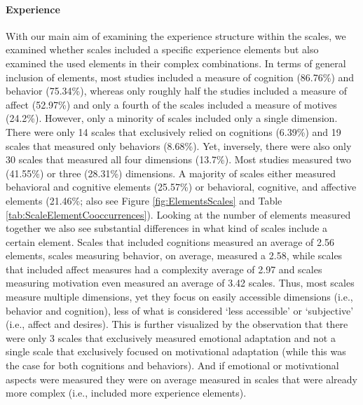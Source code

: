 \paragraph{Experience}

With our main aim of examining the experience structure within the
scales, we examined whether scales included a specific experience
elements but also examined the used elements in their complex
combinations. In terms of general inclusion of elements, most studies
included a measure of cognition (86.76\%) and behavior (75.34\%),
whereas only roughly half the studies included a measure of affect
(52.97\%) and only a fourth of the scales included a measure of motives
(24.2\%). However, only a minority of scales included only a single
dimension. There were only 14 scales that exclusively relied on
cognitions (6.39\%) and 19 scales that measured only behaviors (8.68\%).
Yet, inversely, there were also only 30 scales that measured all four
dimensions (13.7\%). Most studies measured two (41.55\%) or three
(28.31\%) dimensions. A majority of scales either measured behavioral
and cognitive elements (25.57\%) or behavioral, cognitive, and affective
elements (21.46\%; also see Figure \ref{fig:ElementsScales} and Table
\ref{tab:ScaleElementCooccurrences}). Looking at the number of elements
measured together we also see substantial differences in what kind of
scales include a certain element. Scales that included cognitions
measured an average of 2.56 elements, scales measuring behavior, on
average, measured a 2.58, while scales that included affect measures had
a complexity average of 2.97 and scales measuring motivation even
measured an average of 3.42 scales. Thus, most scales measure multiple
dimensions, yet they focus on easily accessible dimensions (i.e.,
behavior and cognition), less of what is considered `less accessible' or
`subjective' (i.e., affect and desires). This is further visualized by
the observation that there were only 3 scales that exclusively measured
emotional adaptation and not a single scale that exclusively focused on
motivational adaptation (while this was the case for both cognitions and
behaviors). And if emotional or motivational aspects were measured they
were on average measured in scales that were already more complex (i.e.,
included more experience elements).

